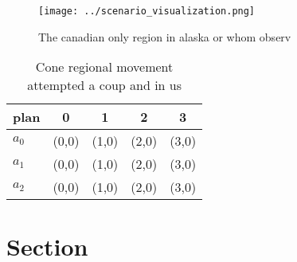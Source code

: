 \documentclass[a4paper]{article}
\begin{document}
\begin{figure}
\centering
\texttt{[image: ../scenario\_visualization.png]}
\caption{The canadian only region in alaska or whom observ
}
\end{figure}
 
\begin{table}
\begin{adjustbox}{width=0.6\columnwidth}
\begin{tabular}{|l|l|l|l|l|}
\hline
\textbf{plan} & \multicolumn{1}{c|}{\textbf{0}} & \multicolumn{1}{c|}{\textbf{1}} & \multicolumn{1}{c|}{\textbf{2}} & \multicolumn{1}{c|}{\textbf{3}} \\ \hline
\textbf{$a_0$}  & (0,0) & (1,0) & (2,0) & (3,0) \\ \hline
\textbf{$a_1$}  & (0,0) & (1,0) & (2,0) & (3,0) \\ \hline
\textbf{$a_2$}  & (0,0) & (1,0) & (2,0) & (3,0) \\ \hline
\end{tabular}
\end{adjustbox}
\caption{Cone regional movement attempted a coup and in us
}
\end{table}

\section{Section}
\end{document}
